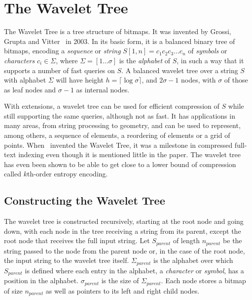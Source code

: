 \section{The Wavelet Tree}
The Wavelet Tree is a tree structure of bitmaps.
It was invented by Grossi, Grupta and Vitter~ in 2003.
In its basic form, it is a balanced binary tree of bitmaps, encoding a \textit{sequence} or \textit{string} $S[1,n] = c_1c_2c_3 \ldots c_n$ of \textit{symbols} or \textit{characters} $c_i \in \Sigma$, where $\Sigma = [1 \ldots \sigma]$ is the \textit{alphabet} of $S$, in such a way that it supports a number of fast queries on $S$.
A balanced wavelet tree over a string $S$ with alphabet $\Sigma$ will have height $h = \lceil \log \sigma \rceil$, and $2 \sigma - 1$ nodes, with $\sigma$ of those as leaf nodes and $\sigma - 1$ as internal nodes.

With extensions, a wavelet tree can be used for efficient compression of $S$ while still supporting the same queries, although not as fast.
It has applications in many areas, from string processing to geometry, and can be used to represent, among others, a sequence of elements, a reordering of elements or a grid of points. 
When~ invented the Wavelet Tree, it was a milestone in compressed full-text indexing even though it is mentioned little in the paper.
The wavelet tree has even been shown to be able to get close to a lower bound of compression called $k$th-order entropy encoding.

\subsection{Constructing the Wavelet Tree}
\label{sec:nodeconstruction}
The wavelet tree is constructed recursively, starting at the root node and going down, with each node in the tree receiving a string from its parent, except the root node that receives the full input string.
Let $S_{\mathit{parent}}$ of length $n_{\mathit{parent}}$ be the string passed to the node from the parent node or, in the case of the root node, the input string to the wavelet tree itself.
$\Sigma_{\mathit{parent}}$ is the alphabet over which $S_{\mathit{parent}}$ is defined where each entry in the alphabet, a \textit{character} or \textit{symbol}, has a position in the alphabet.
$\sigma_{\mathit{parent}}$ is the size of $\Sigma_{\mathit{parent}}$.
Each node stores a bitmap of size $n_{\mathit{parent}}$ as well as pointers to its left and right child nodes.

